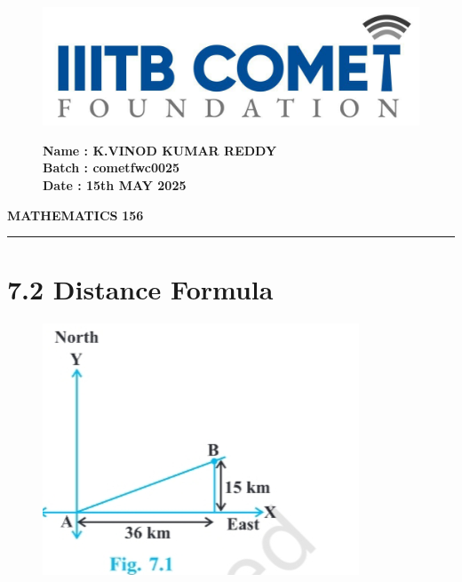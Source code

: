 \documentclass[11pt]{article}
\begin{document}
\begin{figure}[H]
    \begin{minipage}{0.45\textwidth}
        \includegraphics[width=\textwidth]{ki.png}
    \end{minipage}\hfill
    \begin{minipage}{0.45\textwidth}
        \textbf{Name : K.VINOD KUMAR REDDY} \\
        \textbf{Batch : cometfwc0025} \\
        \textbf{Date : 15th MAY 2025}
    \end{minipage}
\end{figure}
\vspace{5em}
{\color{ncertblue}\textbf{MATHEMATICS}} \hfill \textbf{156}                                                                                     {\color{ncertblue}\noindent\rule{\textwidth}{0.5pt}}
\vspace{2em}
\section{7.2 Distance Formula}

\begin{figure}
  \vspace{-20pt}
  \centering
  \includegraphics[width=0.95\linewidth]{suv.png}
  \vspace{-10pt}
\end{figure}
\end{document}
